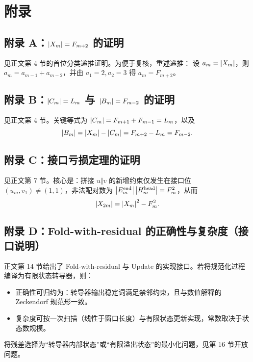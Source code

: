 \section{附录}





\subsection{\texorpdfstring{附录 A：$\left\lvert X_m\right\rvert=F_{m+2}$ 的证明}{附录 A：|Xm|=F(m+2) 的证明}}

见正文第 4 节的首位分类递推证明。为便于复核，重述递推：
设 $a_m=\left\lvert X_m\right\rvert$，则 $a_m=a_{m-1}+a_{m-2}$，并由 $a_1=2,a_2=3$ 得 $a_m=F_{m+2}$。

\subsection{\texorpdfstring{附录 B：$\left\lvert C_m\right\rvert=L_m$ 与 $\left\lvert B_m\right\rvert=F_{m-2}$ 的证明}{附录 B：|Cm|=Lm 与 |Bm|=F(m-2) 的证明}}

见正文第 4 节。关键等式为 $\left\lvert C_m\right\rvert=F_{m+1}+F_{m-1}=L_m$，以及
$$
\left\lvert B_m\right\rvert=\left\lvert X_m\right\rvert-\left\lvert C_m\right\rvert=F_{m+2}-L_m=F_{m-2}.
$$

\subsection{\texorpdfstring{附录 C：接口亏损定理的证明}{附录 C：接口亏损定理的证明}}

见正文第 7 节。核心是：拼接 $u\Vert v$ 的新增约束仅发生在接口位 $(u_m,v_1)\neq(1,1)$，非法配对数为 $\left\lvert E_m^{\mathrm{end}}\right\rvert\left\lvert H_m^{\mathrm{head}}\right\rvert=F_m^2$，从而
$$
\left\lvert X_{2m}\right\rvert=\left\lvert X_m\right\rvert^2-F_m^2.
$$

\subsection{附录 D：Fold-with-residual 的正确性与复杂度（接口说明）}

正文第 14 节给出了 Fold-with-residual 与 Update 的实现接口。若将规范化过程编译为有限状态转导器，则：
\begin{itemize}
  \item 正确性可归约为：转导器输出稳定词满足禁邻约束，且与数值解释的 Zeckendorf 规范形一致。
  \item 复杂度可按一次扫描（线性于窗口长度）与有限状态更新实现，常数取决于状态数规模。
\end{itemize}
将残差选择为“转导器内部状态”或“有限溢出状态”的最小化问题，见第 16 节开放问题。

